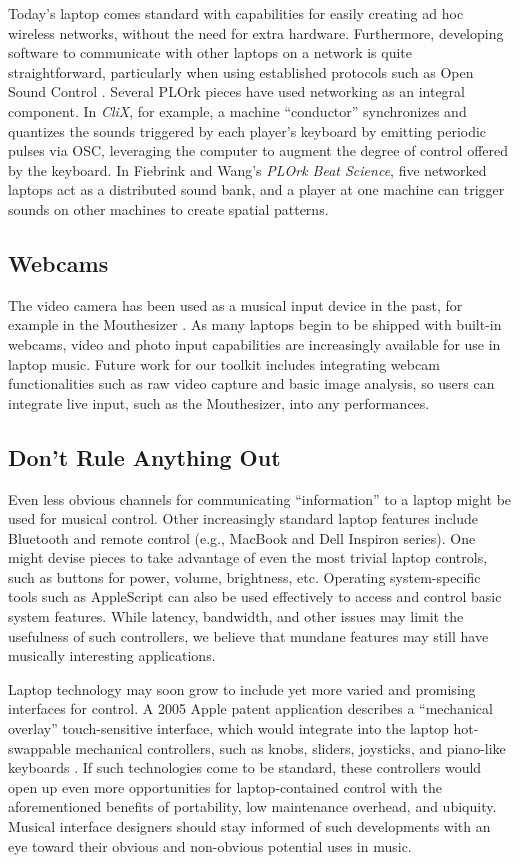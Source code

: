 Today's laptop comes standard with capabilities for easily creating ad hoc
wireless networks, without the need for extra hardware. Furthermore, developing
software to communicate with other laptops on a network is quite straightforward,
particularly when using established protocols such as Open Sound Control \cite{Wright:1997}.
Several PLOrk pieces have used networking as an integral component. In
\textit{CliX}, for example, a machine ``conductor'' synchronizes and quantizes
the sounds triggered by each player's keyboard by emitting periodic pulses via
OSC, leveraging the computer to augment the degree of control offered by the
keyboard. In Fiebrink and Wang's \textit{PLOrk Beat Science}, five networked
laptops act as a distributed sound bank, and a player at one machine can trigger
sounds on other machines to create spatial patterns.

\subsection{Webcams}

The video camera has been used as a musical input device in the past, for
example in the Mouthesizer \cite{Lyons:2001a}. As many laptops begin to be shipped with built-in
webcams, video and photo input capabilities are increasingly available for use in
laptop music. Future work for our toolkit includes integrating webcam
functionalities such as raw video capture and basic image analysis, so users can
integrate live input, such as the Mouthesizer, into any performances.

\subsection{Don't Rule Anything Out}

Even less obvious channels for communicating ``information'' to a laptop might
be used for musical control. Other increasingly standard laptop features include
Bluetooth and remote control (e.g., MacBook and Dell Inspiron series). One might
devise pieces to take advantage of even the most trivial laptop controls, such as
buttons for power, volume, brightness, etc. Operating system-specific tools such
as AppleScript can also be used effectively to access and control basic system
features. While latency, bandwidth, and other issues may limit the usefulness of
such controllers, we believe that mundane features may still have musically
interesting applications.

Laptop technology may soon grow to include yet more varied and promising
interfaces for control. A 2005 Apple patent application describes a ``mechanical
overlay'' touch-sensitive interface, which would integrate into the laptop
hot-swappable mechanical controllers, such as knobs, sliders, joysticks, and
piano-like keyboards \cite{Huppi:2005}. If such technologies come to be standard, these
controllers would open up even more opportunities for laptop-contained control
with the aforementioned benefits of portability, low maintenance overhead, and
ubiquity. Musical interface designers should stay informed of such developments
with an eye toward their obvious and non-obvious potential uses in music.


